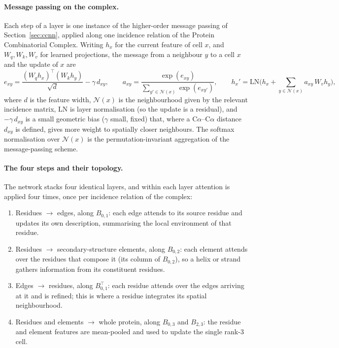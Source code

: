 \documentclass[11pt,a4paper]{article}
\theoremstyle{definition}
\begin{document}
\paragraph{Message passing on the complex.} Each step of a layer is one instance
of the higher-order message passing of Section~\ref{sec:ccnn}, applied along one
incidence relation of the Protein Combinatorial Complex. Writing $h_x$ for the
current feature of cell $x$, and $W_q,W_k,W_v$ for learned projections, the
message from a neighbour $y$ to a cell $x$ and the update of $x$ are
\[
 e_{xy}=\frac{(W_q h_x)^{\top}(W_k h_y)}{\sqrt{d}}-\gamma\,d_{xy},\qquad
 a_{xy}=\frac{\exp(e_{xy})}{\sum_{y'\in\mathcal{N}(x)}\exp(e_{xy'})},\qquad
 h_x'=\mathrm{LN}\!\Big(h_x+\textstyle\sum_{y\in\mathcal{N}(x)}a_{xy}\,W_v h_y\Big),
\]
where $d$ is the feature width, $\mathcal{N}(x)$ is the neighbourhood given by the
relevant incidence matrix, $\mathrm{LN}$ is layer normalisation (so the update is a
residual), and $-\gamma\,d_{xy}$ is a small geometric bias ($\gamma$ small,
fixed) that, where a C$\alpha$--C$\alpha$ distance $d_{xy}$ is defined, gives more
weight to spatially closer neighbours. The softmax normalisation over
$\mathcal{N}(x)$ is the permutation-invariant aggregation of the message-passing
scheme.

\paragraph{The four steps and their topology.} The network stacks four identical
layers, and within each layer attention is applied four times, once per incidence
relation of the complex:

\begin{enumerate}[leftmargin=1.6em,itemsep=3pt]
  \item Residues $\to$ edges, along $B_{0,1}$: each edge attends to its source
        residue and updates its own description, summarising the local environment
        of that residue.
  \item Residues $\to$ secondary-structure elements, along $B_{0,2}$: each
        element attends over the residues that compose it (its column of
        $B_{0,2}$), so a helix or strand gathers information from its constituent
        residues.
  \item Edges $\to$ residues, along $B_{0,1}^{\top}$: each residue attends over
        the edges arriving at it and is refined; this is where a residue
        integrates its spatial neighbourhood.
  \item Residues and elements $\to$ whole protein, along $B_{0,3}$ and $B_{2,3}$:
        the residue and element features are mean-pooled and used to update the
        single rank-3 cell.
\end{enumerate}
\end{document}
